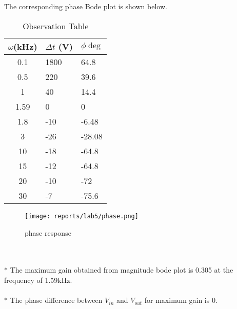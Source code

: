 \documentclass[12pt]{article}
\begin{document}
        \\\\
        \\\\
        \noindent
        The corresponding phase Bode plot is shown below.\\
        \begin{minipage}{\linewidth}
            \centering
            \begin{minipage}{0.4\linewidth}
                \begin{table}[H]
                    \centering
                    \begin{tabular}{|c|l|l|}
                    \hline
                        $\omega$(kHz) &$\Delta t$ (V)&$\phi \deg$\\ \hline
                        0.1	&	1800	&	64.8	\\	\hline
                        0.5	&	220	&	39.6	\\	\hline
                        1	&	40	&	14.4	\\	\hline
                        1.59	&	0	&	0	\\	\hline
                        1.8	&	-10	&	-6.48	\\	\hline
                        3	&	-26	&	-28.08	\\	\hline
                        10	&	-18	&	-64.8	\\	\hline
                        15	&	-12	&	-64.8	\\	\hline
                        20	&	-10	&	-72	\\	\hline
                        30	&	-7	&	-75.6	\\	\hline
                    \end{tabular}
                    \caption{Observation Table}
                    \label{tab:my_label}
                \end{table}
            \end{minipage}
            \hspace{0.02\linewidth}
            \begin{minipage}{0.56\linewidth}
                \begin{figure}[H]
                    \texttt{[image: reports/lab5/phase.png]}
                    \caption{phase response}
                    \label{Va_0_yt}
                \end{figure}
            \end{minipage}
        \end{minipage}
        \\\\
        \noindent
        $\ast$ The maximum gain obtained from magnitude bode plot is 0.305 at the frequency of 1.59kHz.
        \\\\
        \noindent
        $\ast$ The phase difference between $V_{in}$ and $V_{out}$ for maximum gain is 0.
\end{document}
